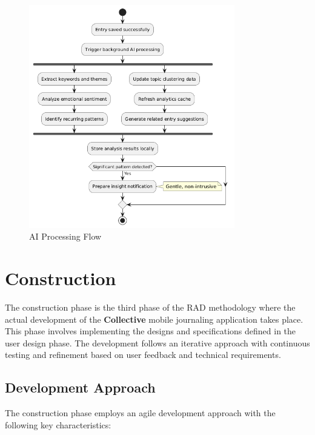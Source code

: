 \begin{figure}[H]
\centering
\includegraphics[width=0.8\textwidth]{files/imgs/ai_processing_flow.png}
\caption{AI Processing Flow}
\label{fig:ai-processing-flow}
\end{figure}

\section{Construction}\label{sec:construction}

The construction phase is the third phase of the RAD methodology where the actual development of the \textbf{Collective} mobile journaling application takes place. This phase involves implementing the designs and specifications defined in the user design phase. The development follows an iterative approach with continuous testing and refinement based on user feedback and technical requirements.

\subsection{Development Approach}\label{subsec:developmentApproach}

The construction phase employs an agile development approach with the following key characteristics:

